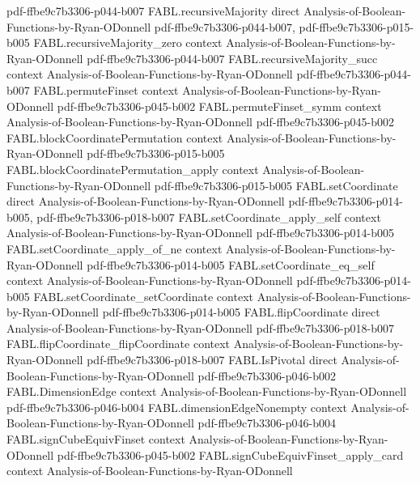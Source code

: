 \begin{theorem}
  {pdf-ffbe9c7b3306-p044-b007}
\proofstep
  {FABL.recursiveMajority}
  {direct}
  {Analysis-of-Boolean-Functions-by-Ryan-ODonnell}
  {pdf-ffbe9c7b3306-p044-b007,
    pdf-ffbe9c7b3306-p015-b005}
\proofstep
  {FABL.recursiveMajority_zero}
  {context}
  {Analysis-of-Boolean-Functions-by-Ryan-ODonnell}
  {pdf-ffbe9c7b3306-p044-b007}
\proofstep
  {FABL.recursiveMajority_succ}
  {context}
  {Analysis-of-Boolean-Functions-by-Ryan-ODonnell}
  {pdf-ffbe9c7b3306-p044-b007}
\proofstep
  {FABL.permuteFinset}
  {context}
  {Analysis-of-Boolean-Functions-by-Ryan-ODonnell}
  {pdf-ffbe9c7b3306-p045-b002}
\proofstep
  {FABL.permuteFinset_symm}
  {context}
  {Analysis-of-Boolean-Functions-by-Ryan-ODonnell}
  {pdf-ffbe9c7b3306-p045-b002}
\proofstep
  {FABL.blockCoordinatePermutation}
  {context}
  {Analysis-of-Boolean-Functions-by-Ryan-ODonnell}
  {pdf-ffbe9c7b3306-p015-b005}
\proofstep
  {FABL.blockCoordinatePermutation_apply}
  {context}
  {Analysis-of-Boolean-Functions-by-Ryan-ODonnell}
  {pdf-ffbe9c7b3306-p015-b005}
\proofstep
  {FABL.setCoordinate}
  {direct}
  {Analysis-of-Boolean-Functions-by-Ryan-ODonnell}
  {pdf-ffbe9c7b3306-p014-b005,
    pdf-ffbe9c7b3306-p018-b007}
\proofstep
  {FABL.setCoordinate_apply_self}
  {context}
  {Analysis-of-Boolean-Functions-by-Ryan-ODonnell}
  {pdf-ffbe9c7b3306-p014-b005}
\proofstep
  {FABL.setCoordinate_apply_of_ne}
  {context}
  {Analysis-of-Boolean-Functions-by-Ryan-ODonnell}
  {pdf-ffbe9c7b3306-p014-b005}
\proofstep
  {FABL.setCoordinate_eq_self}
  {context}
  {Analysis-of-Boolean-Functions-by-Ryan-ODonnell}
  {pdf-ffbe9c7b3306-p014-b005}
\proofstep
  {FABL.setCoordinate_setCoordinate}
  {context}
  {Analysis-of-Boolean-Functions-by-Ryan-ODonnell}
  {pdf-ffbe9c7b3306-p014-b005}
\proofstep
  {FABL.flipCoordinate}
  {direct}
  {Analysis-of-Boolean-Functions-by-Ryan-ODonnell}
  {pdf-ffbe9c7b3306-p018-b007}
\proofstep
  {FABL.flipCoordinate_flipCoordinate}
  {context}
  {Analysis-of-Boolean-Functions-by-Ryan-ODonnell}
  {pdf-ffbe9c7b3306-p018-b007}
\proofstep
  {FABL.IsPivotal}
  {direct}
  {Analysis-of-Boolean-Functions-by-Ryan-ODonnell}
  {pdf-ffbe9c7b3306-p046-b002}
\proofstep
  {FABL.DimensionEdge}
  {context}
  {Analysis-of-Boolean-Functions-by-Ryan-ODonnell}
  {pdf-ffbe9c7b3306-p046-b004}
\proofstep
  {FABL.dimensionEdgeNonempty}
  {context}
  {Analysis-of-Boolean-Functions-by-Ryan-ODonnell}
  {pdf-ffbe9c7b3306-p046-b004}
\proofstep
  {FABL.signCubeEquivFinset}
  {context}
  {Analysis-of-Boolean-Functions-by-Ryan-ODonnell}
  {pdf-ffbe9c7b3306-p045-b002}
\proofstep
  {FABL.signCubeEquivFinset_apply_card}
  {context}
  {Analysis-of-Boolean-Functions-by-Ryan-ODonnell}

\end{theorem}
